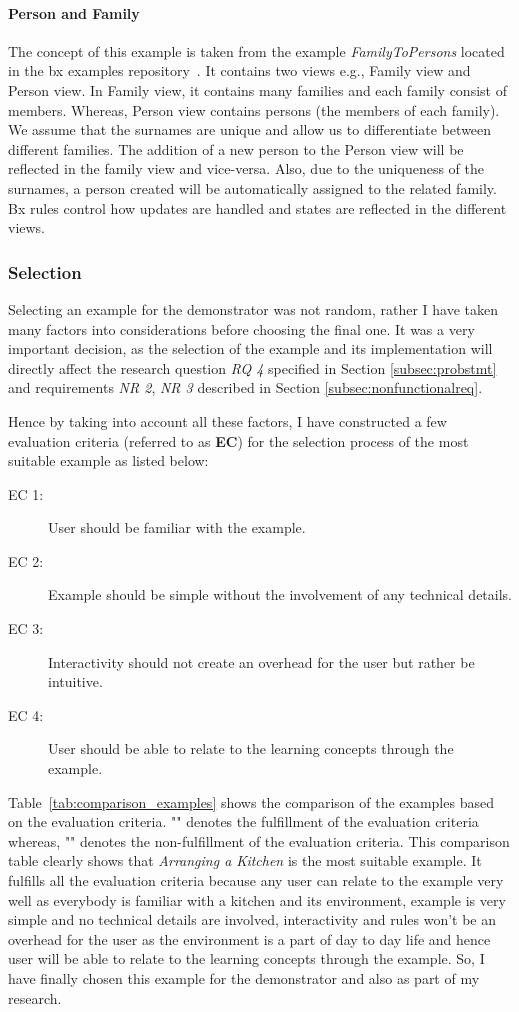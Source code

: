 \paragraph{Person and Family}
The concept of this example is taken from the example \emph{FamilyToPersons} located in the bx examples repository~\cite{bx-examples}. It contains two views e.g., Family view and Person view. In Family view, it contains many families and each family consist of members. Whereas, Person view contains persons (the members of each family). We assume that the surnames are unique and allow us to differentiate between different families. The addition of a new person to the Person view will be reflected in the family view and vice-versa. Also, due to the uniqueness of the surnames, a person created will be automatically assigned to the related family. Bx rules control how updates are handled and states are reflected in the different views.

\subsubsection{Selection}\label{subsubsec:exampleselection}
Selecting an example for the demonstrator was not random, rather I have taken many factors into considerations before choosing the final one. It was a very important decision, as the selection of the example and its implementation will directly affect the research question \textit{RQ 4} specified in Section \ref{subsec:probstmt} and requirements \textit{NR 2}, \textit{NR 3} described in Section \ref{subsec:nonfunctionalreq}.

Hence by taking into account all these factors, I have constructed a few evaluation criteria (referred to as \textbf{EC}) for the selection process of the most suitable example as listed below:
\begin{description}
	\item [EC 1:] User should be familiar with the example.
	\item [EC 2:] Example should be simple without the involvement of any technical details.
	\item [EC 3:] Interactivity should not create an overhead for the user but rather be intuitive.
	\item [EC 4:] User should be able to relate to the learning concepts through the example.
\end{description}

Table~\ref{tab:comparison_examples} shows the comparison of the examples based on the evaluation criteria. "\checkmark" denotes the fulfillment of the evaluation criteria whereas, "" denotes the non-fulfillment of the evaluation criteria. This comparison table clearly shows that \textit{Arranging a Kitchen} is the most suitable example. It fulfills all the evaluation criteria because any user can relate to the example very well as everybody is familiar with a kitchen and its environment, example is very simple and no technical details are involved, interactivity and rules won't be an overhead for the user as the environment is a part of day to day life and hence user will be able to relate to the learning concepts through the example. So, I have finally chosen this example for the demonstrator and also as part of my research.

